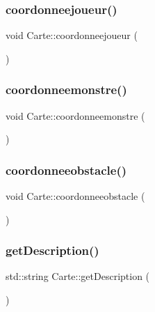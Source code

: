 \mbox{\label{class_carte_ae11b9253ce5aa727b6c49320f92e0668}} 
\subsubsection{\texorpdfstring{coordonneejoueur()}{coordonneejoueur()}}
{\footnotesize\ttfamily void Carte\+::coordonneejoueur (\begin{DoxyParamCaption}{ }\end{DoxyParamCaption})}

\mbox{\label{class_carte_ad3f5fbdd5c6a248e92bad65680493ccd}} 
\subsubsection{\texorpdfstring{coordonneemonstre()}{coordonneemonstre()}}
{\footnotesize\ttfamily void Carte\+::coordonneemonstre (\begin{DoxyParamCaption}{ }\end{DoxyParamCaption})}

\mbox{\label{class_carte_a2a0ac8476d52a07b9cbcec0507df840d}} 
\subsubsection{\texorpdfstring{coordonneeobstacle()}{coordonneeobstacle()}}
{\footnotesize\ttfamily void Carte\+::coordonneeobstacle (\begin{DoxyParamCaption}{ }\end{DoxyParamCaption})}

\mbox{\label{class_carte_a591705d6bb95c36ce4a034b3107ae85c}} 
\subsubsection{\texorpdfstring{get\+Description()}{getDescription()}}
{\footnotesize\ttfamily std\+::string Carte\+::get\+Description (\begin{DoxyParamCaption}{ }\end{DoxyParamCaption})}

